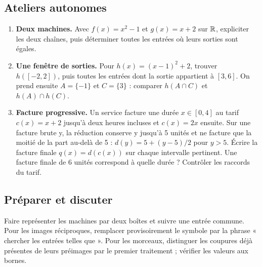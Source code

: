 \subsection{Ateliers autonomes}
\begin{enumerate}
\item \textbf{Deux machines.} Avec $f(x)=x^2-1$ et $g(x)=x+2$ sur $\mathbb{R}$, expliciter les deux chaînes, puis déterminer toutes les entrées où leurs sorties sont égales.
\item \textbf{Une fenêtre de sorties.} Pour $h(x)=(x-1)^2+2$, trouver $h([-2,2])$, puis toutes les entrées dont la sortie appartient à $[3,6]$. On prend ensuite $A=\{-1\}$ et $C=\{3\}$ : comparer $h(A\cap C)$ et $h(A)\cap h(C)$.
\item \textbf{Facture progressive.} Un service facture une durée $x\in[0,4]$ au tarif $c(x)=x+2$ jusqu'à deux heures incluses et $c(x)=2x$ ensuite. Sur une facture brute y, la réduction conserve y jusqu'à 5 unités et ne facture que la moitié de la part au-delà de 5 : $d(y)=5+(y-5)/2$ pour $y>5$. Écrire la facture finale $q(x)=d(c(x))$ sur chaque intervalle pertinent. Une facture finale de 6 unités correspond à quelle durée ? Contrôler les raccords du tarif.
\end{enumerate}
\ifprof
\subsection{Préparer et discuter}
Faire représenter les machines par deux boîtes et suivre une entrée commune. Pour les images réciproques, remplacer provisoirement le symbole par la phrase « chercher les entrées telles que ». Pour les morceaux, distinguer les coupures déjà présentes de leurs préimages par le premier traitement ; vérifier les valeurs aux bornes.

\fi
